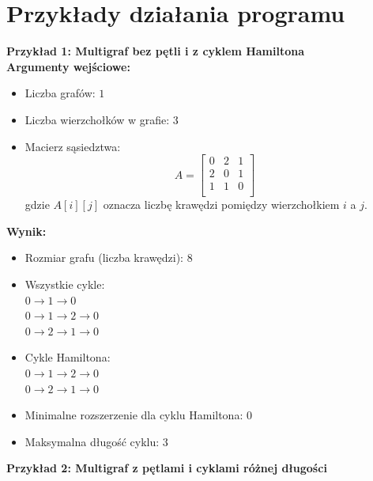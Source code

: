 \section{Przykłady działania programu}

\noindent \textbf{Przykład 1: Multigraf bez pętli i z cyklem Hamiltona} \\

\noindent \textbf{Argumenty wejściowe:}
\begin{itemize}
    \item Liczba grafów: \(1\)
    \item Liczba wierzchołków w grafie: \(3\)
    \item Macierz sąsiedztwa:
    \[
    A = \begin{bmatrix}
    0 & 2 & 1 \\
    2 & 0 & 1 \\
    1 & 1 & 0 \\
    \end{bmatrix}
    \]
    gdzie \(A[i][j]\) oznacza liczbę krawędzi pomiędzy wierzchołkiem \(i\) a \(j\).
\end{itemize}

\noindent \textbf{Wynik:}
\begin{itemize}
    \item Rozmiar grafu (liczba krawędzi): \(8\)
    \item Wszystkie cykle: 
        	\\ \(0 \to 1 \to 0\)
    		\\ \(0 \to 1 \to 2 \to 0\)
        	\\ \(0 \to 2 \to 1 \to 0\)
    \item Cykle Hamiltona:
        	\\ \(0 \to 1 \to 2 \to 0\)
        	\\ \(0 \to 2 \to 1 \to 0\)
    \item Minimalne rozszerzenie dla cyklu Hamiltona: \(0\)
    \item Maksymalna długość cyklu: \(3\)
\end{itemize}

\vspace{1em}

\noindent \textbf{Przykład 2: Multigraf z pętlami i cyklami różnej długości} \\

